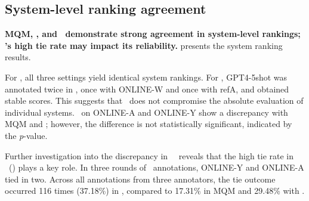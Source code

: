 \begin{table}[htbp]
    \fontsize{5}{6}\selectfont
    \centering
    \caption{
    Tie rate in three annotation settings. \sxsqr~has the highest tie rate in both language pairs.
    }
    \label{tab:tie_rate}
\vspace{-5pt}
\end{table}


\subsection{System-level ranking agreement}\label{sec:sys_level_agreement}



\textbf{MQM, \sxsmqm, and \sxsqr~demonstrate strong agreement in system-level rankings; \sxsqr's high tie rate may impact its reliability.}  presents the system ranking results. 

For \ZhEn, all three settings yield identical system rankings. For \EnDe, GPT4-5shot was annotated twice in \sxsmqm, once with ONLINE-W and once with refA, and obtained stable scores. This suggests that \sxsmqm~does not compromise the absolute evaluation of individual systems. \sxsqr~on ONLINE-A and ONLINE-Y show a discrepancy with MQM and \sxsmqm; however, the difference is not statistically significant, indicated by the \textit{p}-value.

Further investigation into the discrepancy in \EnDe~\sxsqr~reveals that the high tie rate in \sxsqr~() plays a key role. In three rounds of \sxsqr~annotations, ONLINE-Y and ONLINE-A tied in two. Across all annotations from three annotators, the tie outcome occurred 116 times (37.18\%) in \sxsmqm, compared to 17.31\% in MQM and 29.48\% with \sxsmqm.


